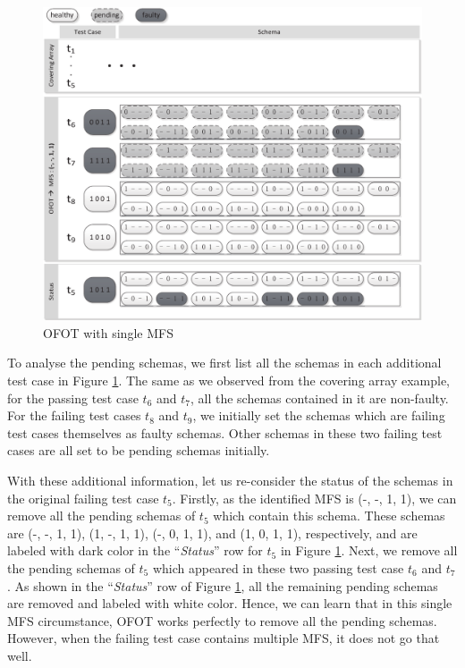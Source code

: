 \begin{figure}[ht]
 \centering
 \includegraphics[width=5.6in]{ofot_single.pdf}
 \caption{OFOT with single MFS}
 \label{fig_ofot_single}
\end{figure}

To analyse the pending schemas, we first list all the schemas in each additional test case in Figure \ref{fig_ofot_single}. The same as we observed from the covering array example, for the passing test case $t_{6}$ and $t_{7}$, all the schemas contained in it are non-faulty. For the failing test cases $t_{8}$ and $t_{9}$, we initially set the schemas which are failing test cases themselves as faulty schemas. Other schemas in these two failing test cases are all set to be pending schemas initially.

With these additional information, let us re-consider the status of the schemas in the original failing test case $t_{5}$. Firstly, as the identified MFS is (-, -, 1, 1), we can remove all the pending schemas of $t_{5}$ which contain this schema. These schemas are (-, -, 1, 1), (1, -, 1, 1), (-, 0, 1, 1), and (1, 0, 1, 1), respectively, and are labeled with dark color in the  ``\emph{Status}'' row for $t_{5}$ in Figure \ref{fig_ofot_single}. Next, we remove all the pending schemas of $t_{5}$ which appeared in these two passing test case $t_{6}$ and $t_{7}$. As shown in the  ``\emph{Status}'' row of Figure \ref{fig_ofot_single}, all the remaining pending schemas are removed and labeled with white color. Hence, we can learn that in this single MFS circumstance, OFOT works perfectly to remove all the pending schemas. However, when the failing test case contains multiple MFS, it does not go that well.

